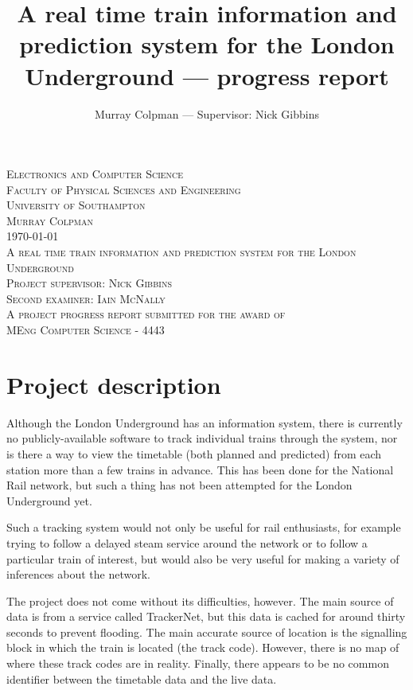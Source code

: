 \documentclass[a4paper,12pt]{article}
\title{A real time train information and prediction system for the London Underground --- progress report}
\author{Murray Colpman --- Supervisor: Nick Gibbins}
\begin{document}
\begin{titlepage}
  \begin{center}
    \textsc{\Large Electronics and Computer Science}\\
    \textsc{\Large Faculty of Physical Sciences and Engineering}\\
    \textsc{\Large University of Southampton}\\[1.5cm]
    \textsc{\Large Murray Colpman}\\
    \textsc{\Large \today}\\[1.5cm]
    \textsc{\LARGE A real time train information and prediction system for the London Underground}\\[1.5cm]
    \textsc{\large Project supervisor: Nick Gibbins}\\
    \textsc{\large Second examiner: Iain McNally}\\[1.5cm]
    \textsc{\large A project progress report submitted for the award of}\\
    \textsc{\large MEng Computer Science - 4443}
  \end{center}
\end{titlepage}

\section*{Project description}

Although the London Underground has an information system, there is currently
no publicly-available software to track individual trains through the system,
nor is there a way to view the timetable (both planned and predicted) from each
station more than a few trains in advance. This has been done for the National
Rail network, but such a thing has not been attempted for the London
Underground yet.

Such a tracking system would not only be useful for rail enthusiasts, for
example trying to follow a delayed steam service around the network or to
follow a particular train of interest, but would also be very useful for making
a variety of inferences about the network.

The project does not come without its difficulties, however. The main source of
data is from a service called TrackerNet, but this data is cached for around
thirty seconds to prevent flooding. The main accurate source of location is the
signalling block in which the train is located (the track code).  However,
there is no map of where these track codes are in reality. Finally, there
appears to be no common identifier between the timetable data and the live
data.
\end{document}
